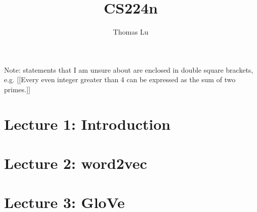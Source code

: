 \documentclass{article}
\title{CS224n}
\author{Thomas Lu}
\date{}
\begin{document}
\maketitle
Note: statements that I am unsure about are enclosed in double square brackets, e.g. [[Every even integer greater than 4 can be expressed as the sum of two primes.]]
\section{Lecture 1: Introduction}

\section{Lecture 2: word2vec}

\section{Lecture 3: GloVe}

\end{document}
